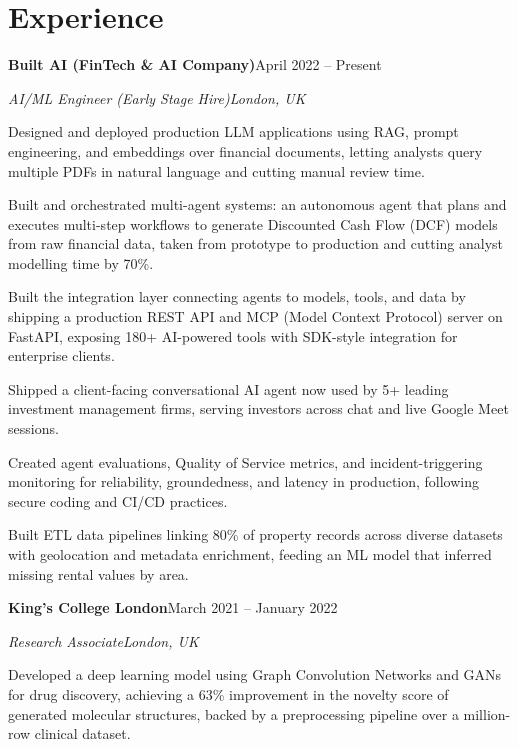 \documentclass[10pt,a4paper]{article}
\newcommand{\entry}[4]{%
  {\color{company}\bfseries #1}\hfill {\color{muted}#2}\par
  \vspace{1pt}
  {\itshape #3}\hfill {\color{muted}\itshape #4}\par
  \vspace{3pt}%
}
\begin{document}
\section{Experience}
\entry{Built AI (FinTech \& AI Company)}{April 2022 -- Present}{AI/ML Engineer (Early Stage Hire)}{London, UK}
\begin{tight}
  \item Designed and deployed production LLM applications using RAG, prompt engineering, and embeddings over financial documents, letting analysts query multiple PDFs in natural language and cutting manual review time.
  \item Built and orchestrated multi-agent systems: an autonomous agent that plans and executes multi-step workflows to generate Discounted Cash Flow (DCF) models from raw financial data, taken from prototype to production and cutting analyst modelling time by 70\%.
  \item Built the integration layer connecting agents to models, tools, and data by shipping a production REST API and MCP (Model Context Protocol) server on FastAPI, exposing 180+ AI-powered tools with SDK-style integration for enterprise clients.
  \item Shipped a client-facing conversational AI agent now used by 5+ leading investment management firms, serving investors across chat and live Google Meet sessions.
  \item Created agent evaluations, Quality of Service metrics, and incident-triggering monitoring for reliability, groundedness, and latency in production, following secure coding and CI/CD practices.
  \item Built ETL data pipelines linking 80\% of property records across diverse datasets with geolocation and metadata enrichment, feeding an ML model that inferred missing rental values by area.
\end{tight}

\entry{King's College London}{March 2021 -- January 2022}{Research Associate}{London, UK}
\begin{tight}
  \item Developed a deep learning model using Graph Convolution Networks and GANs for drug discovery, achieving a 63\% improvement in the novelty score of generated molecular structures, backed by a preprocessing pipeline over a million-row clinical dataset.
\end{tight}

\end{document}

